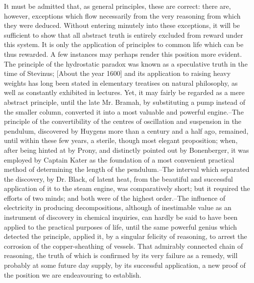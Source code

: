 \documentclass{aa}
\begin{document}
It must be admitted that, as general principles, these are correct:
there are, however, exceptions which flow necessarily from the very
reasoning from which they were deduced. Without entering minutely into
these exceptions, it will be sufficient to show that all abstract truth
is entirely excluded from reward under this system. It is only the
application of principles to common life which can be thus rewarded.
A few instances may perhaps render this position more evident. The
principle of the hydrostatic paradox was known as a speculative truth
in the time of Stevinus; [About the year 1600] and its application to
raising heavy weights has long been stated in elementary treatises on
natural philosophy, as well as constantly exhibited in lectures. Yet, it
may fairly be regarded as a mere abstract principle, until the late Mr.
Bramah, by substituting a pump instead of the smaller column, converted
it into a most valuable and powerful engine.--The principle of the
convertibility of the centres of oscillation and suspension in the
pendulum, discovered by Huygens more than a century and a half ago,
remained, until within these few years, a sterile, though most elegant
proposition; when, after being hinted at by Prony, and distinctly
pointed out by Bonenberger, it was employed by Captain Kater as the
foundation of a most convenient practical method of determining the
length of the pendulum.--The interval which separated the discovery, by
Dr. Black, of latent heat, from the beautiful and successful application
of it to the steam engine, was comparatively short; but it required the
efforts of two minds; and both were of the highest order.--The influence
of electricity in producing decompositions, although of inestimable
value as an instrument of discovery in chemical inquiries, can hardly be
said to have been applied to the practical purposes of life, until the
same powerful genius which detected the principle, applied it, by
a singular felicity of reasoning, to arrest the corrosion of the
copper-sheathing of vessels. That admirably connected chain of
reasoning, the truth of which is confirmed by its very failure as a
remedy, will probably at some future day supply, by its successful
application, a new proof of the position we are endeavouring to
establish.
\end{document}

